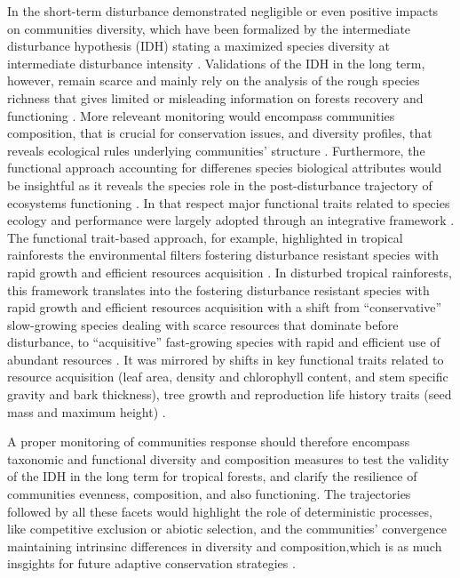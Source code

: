 \documentclass[fleqn,10pt]{ArtEcoFoG} %
\theoremstyle{definition}
\theoremstyle{definition}
\theoremstyle{definition}
\theoremstyle{remark}
\begin{document}
In the short-term disturbance demonstrated negligible or even positive
impacts on communities diversity, which have been formalized by the
intermediate disturbance hypothesis (IDH) stating a maximized species
diversity at intermediate disturbance intensity
\citep{Molino2001, Kariuki2006a, Berry2008a}. Validations of the IDH in
the long term, however, remain scarce and mainly rely on the analysis of
the rough species richness that gives limited or misleading information
on forests recovery and functioning \citep{Martin2015, Chaudhary2016}.
More releveant monitoring would encompass communities composition, that
is crucial for conservation issues, and diversity profiles, that reveals
ecological rules underlying communities' structure
\citep{Magurran1988, Lavorel2002, Bellwood2006}. Furthermore, the
functional approach accounting for differenes species biological
attributes would be insightful as it reveals the species role in the
post-disturbance trajectory of ecosystems functioning
\citep{Violle2007b, Moretti2009, Baraloto2012a, Scheiter2013}. In that
respect major functional traits related to species ecology and
performance were largely adopted through an integrative framework
\citep{Diaz2005, Villeger2008a}. The functional trait-based approach,
for example, highlighted in tropical rainforests the environmental
filters fostering disturbance resistant species with rapid growth and
efficient resources acquisition \citep{Molino2001, Haddad2008}. In
disturbed tropical rainforests, this framework translates into the
fostering disturbance resistant species with rapid growth and efficient
resources acquisition \citep{Molino2001, Haddad2008} with a shift from
``conservative'' slow-growing species dealing with scarce resources that
dominate before disturbance, to ``acquisitive'' fast-growing species
with rapid and efficient use of abundant resources
\citep{TerSteege2001, Reich2014, Herault2011}. It was mirrored by shifts
in key functional traits related to resource acquisition (leaf area,
density and chlorophyll content, and stem specific gravity and bark
thickness), tree growth and reproduction life history traits (seed mass
and maximum height) \citep{Wright2004, Westoby2006a, Chave2009b}.

A proper monitoring of communities response should therefore encompass
taxonomic and functional diversity and composition measures to test the
validity of the IDH in the long term for tropical forests, and clarify
the resilience of communities evenness, composition, and also
functioning. The trajectories followed by all these facets would
highlight the role of deterministic processes, like competitive
exclusion or abiotic selection, and the communities' convergence
maintaining intrinsinc differences in diversity and composition,which is
as much insgights for future adaptive conservation strategies
\citep{Adler2007}.
\end{document}
